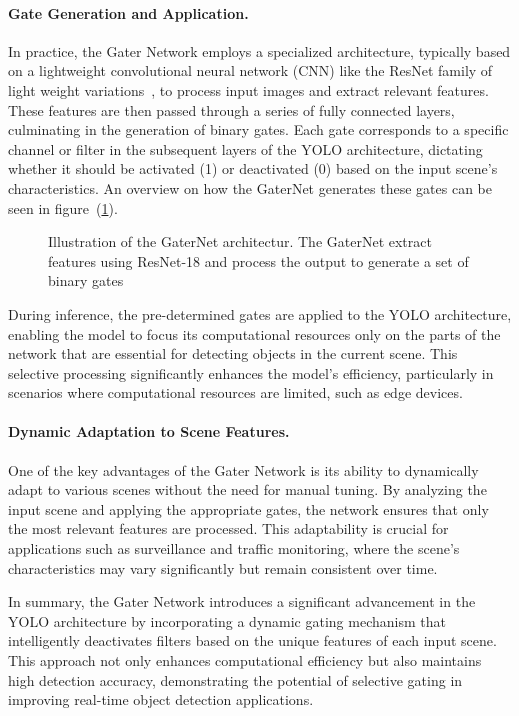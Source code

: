 \paragraph{Gate Generation and Application.} In practice, the Gater Network employs a specialized architecture, typically based on a lightweight convolutional neural network (CNN) like the ResNet family of light weight variations~\cite{he2016deep}, to process input images and extract relevant features. These features are then passed through a series of fully connected layers, culminating in the generation of binary gates. Each gate corresponds to a specific channel or filter in the subsequent layers of the YOLO architecture, dictating whether it should be activated (1) or deactivated (0) based on the input scene's characteristics. An overview on how the GaterNet generates these gates can be seen in figure~(\ref{fig:gaternet_architecture}).

\begin{figure}[ht]
    \centering
    
    \caption{Illustration of the GaterNet architectur. The GaterNet extract features using ResNet-18 and process the output to generate a set of binary gates}
    \label{fig:gaternet_architecture}
    \end{figure}

During inference, the pre-determined gates are applied to the YOLO architecture, enabling the model to focus its computational resources only on the parts of the network that are essential for detecting objects in the current scene. This selective processing significantly enhances the model's efficiency, particularly in scenarios where computational resources are limited, such as edge devices.

\paragraph{Dynamic Adaptation to Scene Features.} One of the key advantages of the Gater Network is its ability to dynamically adapt to various scenes without the need for manual tuning. By analyzing the input scene and applying the appropriate gates, the network ensures that only the most relevant features are processed. This adaptability is crucial for applications such as surveillance and traffic monitoring, where the scene's characteristics may vary significantly but remain consistent over time.

In summary, the Gater Network introduces a significant advancement in the YOLO architecture by incorporating a dynamic gating mechanism that intelligently deactivates filters based on the unique features of each input scene. This approach not only enhances computational efficiency but also maintains high detection accuracy, demonstrating the potential of selective gating in improving real-time object detection applications.

